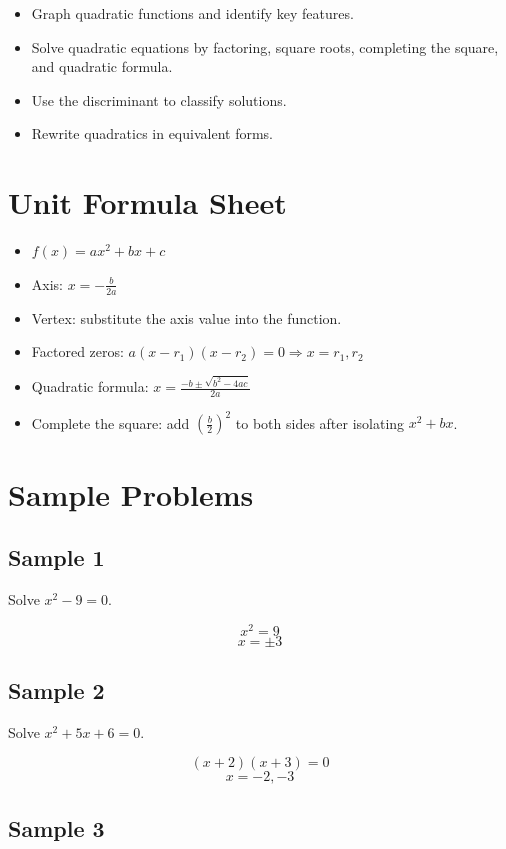 \documentclass[11pt]{book}
\begin{document}
\begin{itemize}
\item Graph quadratic functions and identify key features.
\item Solve quadratic equations by factoring, square roots, completing the square, and quadratic formula.
\item Use the discriminant to classify solutions.
\item Rewrite quadratics in equivalent forms.
\end{itemize}

\section{Unit Formula Sheet}

\begin{itemize}
\item \(f(x)=ax^2+bx+c\)
\item Axis: \(x=-\frac{b}{2a}\)
\item Vertex: substitute the axis value into the function.
\item Factored zeros: \(a(x-r_1)(x-r_2)=0\Rightarrow x=r_1,r_2\)
\item Quadratic formula: \(x=\frac{-b\pm\sqrt{b^2-4ac}}{2a}\)
\item Complete the square: add \((\frac b2)^2\) to both sides after isolating \(x^2+bx\).
\end{itemize}

\section{Sample Problems}

\subsection{Sample 1}

Solve \(x^2-9=0\).

\[x^2=9\]
\[x=\pm3\]

\subsection{Sample 2}

Solve \(x^2+5x+6=0\).

\[(x+2)(x+3)=0\]
\[x=-2,-3\]

\subsection{Sample 3}
\end{document}
